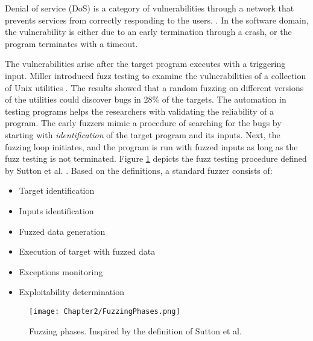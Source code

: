 Denial of service (DoS) is a category of vulnerabilities through a network that prevents services from correctly responding to the users.  \cite{dos}. In the software domain, the vulnerability is either due to an early termination through a crash, or the program terminates with a timeout.

The vulnerabilities arise after the target program executes with a triggering input. Miller introduced fuzz testing to examine the vulnerabilities of a collection of Unix utilities \cite{miller1990empirical}. The results showed that a random fuzzing on different versions of the utilities could discover bugs in 28\% of the targets. The automation in testing programs helps the researchers with validating the reliability of a program. The early fuzzers mimic a procedure of searching for the bugs by starting with \textit{identification} of the target program and its inputs. Next, the fuzzing loop initiates, and the program is run with fuzzed inputs as long as the fuzz testing is not terminated. Figure \ref{fig:fuzz_phases} depicts the fuzz testing procedure defined by Sutton et al. \cite{sutton2007fuzzing}. Based on the definitions, a standard fuzzer consists of:

\begin{itemize}
    \item Target identification
    \item Inputs identification
    \item Fuzzed data generation
    \item Execution of target with fuzzed data
    \item Exceptions monitoring
    \item Exploitability determination
\end{itemize}

\begin{figure}[!b]
  \texttt{[image: Chapter2/FuzzingPhases.png]}
  \centering
  \caption{Fuzzing phases. Inspired by the definition of Sutton et al. \cite{sutton2007fuzzing}}
  \label{fig:fuzz_phases}
\end{figure}

